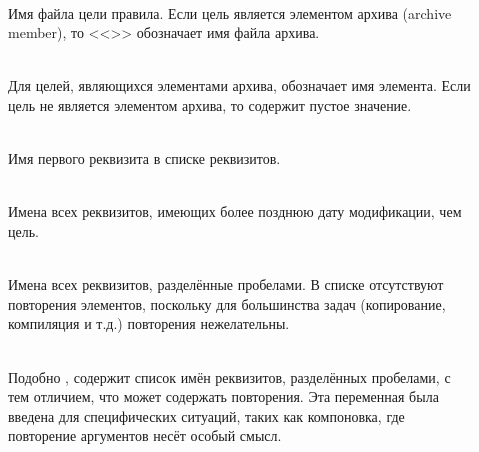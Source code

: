 \begin{description}
\item[] \hfill \\
Имя файла цели правила. Если цель является элементом архива (archive
member), то <<>> обозначает имя файла архива.

\item[\variable{\$\%}] \hfill \\
Для целей, являющихся элементами архива, обозначает имя
элемента. Если цель не является элементом архива, то \variable{\$\%}
содержит пустое значение.

\item[\variable{\${}<}] \hfill \\
Имя первого реквизита в списке реквизитов.

\item[] \hfill \\
Имена всех реквизитов, имеющих более позднюю дату модификации, чем
цель.

\item[\variable{\$\^}] \hfill \\
Имена всех реквизитов, разделённые пробелами. В списке отсутствуют
повторения элементов, поскольку для большинства задач (копирование,
компиляция и т.д.) повторения нежелательны.

\item[\variable{\$+}] \hfill \\
Подобно , содержит список имён реквизитов, разделённых
пробелами, с тем отличием, что может содержать повторения. Эта
переменная была введена для специфических ситуаций, таких как
компоновка, где повторение аргументов несёт особый смысл.


\end{description}
